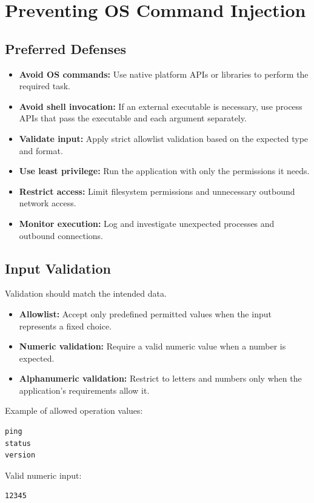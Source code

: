 \documentclass[12pt,a4paper]{article}
\newcommand{\nsection}[1]{\section{#1}}
\newcommand{\nsubsection}[1]{\subsection{#1}}
\begin{document}
\newpage
\nsection{Preventing OS Command Injection}

\vspace{0.5cm}
\nsubsection{Preferred Defenses}

\begin{itemize}
    \item \textbf{Avoid OS commands:}
          Use native platform APIs or libraries to perform the required task.
    \item \textbf{Avoid shell invocation:}
          If an external executable is necessary, use process APIs that
          pass the executable and each argument separately.
    \item \textbf{Validate input:}
          Apply strict allowlist validation based on the expected type
          and format.
    \item \textbf{Use least privilege:}
          Run the application with only the permissions it needs.
    \item \textbf{Restrict access:}
          Limit filesystem permissions and unnecessary outbound
          network access.
    \item \textbf{Monitor execution:}
          Log and investigate unexpected processes and outbound connections.
\end{itemize}

\vspace{0.5cm}
\nsubsection{Input Validation}

Validation should match the intended data.

\begin{itemize}
    \item \textbf{Allowlist:}
          Accept only predefined permitted values when the input
          represents a fixed choice.
    \item \textbf{Numeric validation:}
          Require a valid numeric value when a number is expected.
    \item \textbf{Alphanumeric validation:}
          Restrict to letters and numbers only when the application's
          requirements allow it.
\end{itemize}

Example of allowed operation values:

\begin{lstlisting}
ping
status
version
\end{lstlisting}

Valid numeric input:

\begin{lstlisting}
12345
\end{lstlisting}
\end{document}
